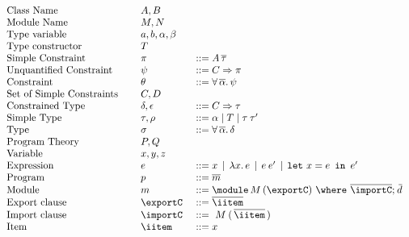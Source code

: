 \begin{figure} 

\[ \begin{array}[c]{llll}
\textrm{Class Name}         &\hspace{.1cm} & A,B            & \\
\textrm{Module Name}        &              & M,N            & \\
\textrm{Type variable}      &         & a,b,\alpha,\beta & \\
\textrm{Type constructor}   &         & T              & \\
\textrm{Simple Constraint}  &         & \pi            & ::= A\,\overline{\tau}\\
\textrm{Unquantified Constraint} &    & \psi           & ::= C\Rightarrow \pi\\
\textrm{Constraint}         &         & \theta         & ::= \forall\,\overline{\alpha}.\,\psi\\
\textrm{Set of Simple Constraints} &  & C,D            & \\
\textrm{Constrained Type}   &         & \delta,\epsilon & ::= C\Rightarrow \tau\\
\textrm{Simple Type}        &         & \tau, \rho     & ::= \alpha \mid T \mid \tau\:\tau' \\
\textrm{Type}               &         & \sigma         & ::= \forall\,\overline{\alpha}.\,\delta\\
\textrm{Program Theory}     &         & P,Q            &\\
\textrm{Variable}           &         & x, y, z        &\\
\textrm{Expression}         &         & e              & ::= x \,\mid\, \lambda x.\,e  \,\mid\, e\:e' \,\mid\, \mlet x = e\,\iin\,e'\\ 
\textrm{Program}            &         & p              & ::= \overline{m}\\
\textrm{Module}             &         & m              & ::= \module\, M\, (\exportC) \ \where\ \overline{\importC};\: \overline{\!d}\\
\textrm{Export clause}      &         & \exportC\      & ::= \overline{\iitem}\\
\textrm{Import clause}      &         & \importC\      & ::= \ M\: (\,\overline{\iitem}\,)\\
\textrm{Item}               &         & \iitem         & ::= x \\ %

\end{array}\]
\end{figure}
